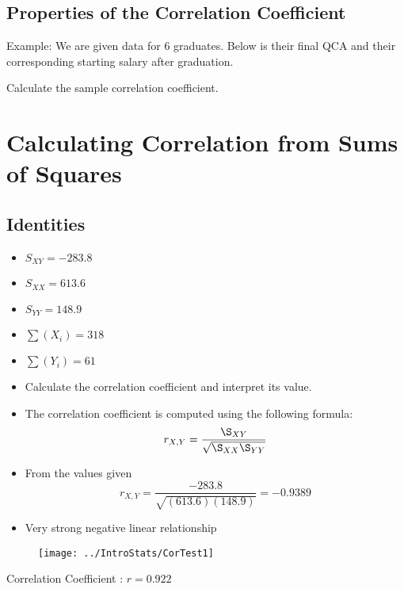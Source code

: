 
\subsection{Properties of the Correlation Coefficient}
Example: We are given data for 6 graduates. Below is their
final QCA and their corresponding starting salary after
graduation.


Calculate the sample correlation coefficient.


\section{Calculating Correlation from Sums of Squares}
\subsection{Identities}
\begin{itemize}
\item $S_{XY} = -283.8$
\item $S_{XX} = 613.6$
\item $S_{YY} = 148.9$
\item $\sum(X_i)  = 318 $
\item $\sum(Y_i)  = 61$
\end{itemize}

\begin{itemize}
\item Calculate the correlation coefficient and interpret its value.
\item The correlation coefficient is computed using the following formula:
\[ r_{X,Y} = \frac{\S_{XY}}{\sqrt{\S_{XX}\S_{YY}}} \]
\item From the values given
\[ r_{X,Y} = \frac{-283.8}{\sqrt{(613.6)(148.9)}} = -0.9389 \]
\item Very strong negative linear relationship
\end{itemize}



\begin{figure}
\centering
\texttt{[image: ../IntroStats/CorTest1]}
\end{figure}
{

Correlation Coefficient : $r = 0.922$
}



